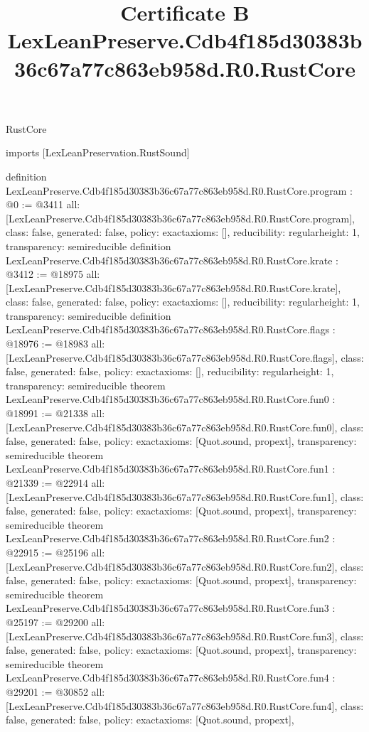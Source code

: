 \begin{lexlean}{RustCore}
\title{Certificate B LexLeanPreserve.Cdb4f185d30383b36c67a77c863eb958d.R0.RustCore}
\begin{coremodule}
imports [LexLeanPreservation.RustSound]

definition LexLeanPreserve.Cdb4f185d30383b36c67a77c863eb958d.R0.RustCore.program : @0 := @3411 {
  all: [LexLeanPreserve.Cdb4f185d30383b36c67a77c863eb958d.R0.RustCore.program],
  class: false,
  generated: false,
  policy: exact{axioms: []},
  reducibility: regular{height: 1},
  transparency: semireducible
}
definition LexLeanPreserve.Cdb4f185d30383b36c67a77c863eb958d.R0.RustCore.krate : @3412 := @18975 {
  all: [LexLeanPreserve.Cdb4f185d30383b36c67a77c863eb958d.R0.RustCore.krate],
  class: false,
  generated: false,
  policy: exact{axioms: []},
  reducibility: regular{height: 1},
  transparency: semireducible
}
definition LexLeanPreserve.Cdb4f185d30383b36c67a77c863eb958d.R0.RustCore.flags : @18976 := @18983 {
  all: [LexLeanPreserve.Cdb4f185d30383b36c67a77c863eb958d.R0.RustCore.flags],
  class: false,
  generated: false,
  policy: exact{axioms: []},
  reducibility: regular{height: 1},
  transparency: semireducible
}
theorem LexLeanPreserve.Cdb4f185d30383b36c67a77c863eb958d.R0.RustCore.fun0 : @18991 := @21338 {
  all: [LexLeanPreserve.Cdb4f185d30383b36c67a77c863eb958d.R0.RustCore.fun0],
  class: false,
  generated: false,
  policy: exact{axioms: [Quot.sound, propext]},
  transparency: semireducible
}
theorem LexLeanPreserve.Cdb4f185d30383b36c67a77c863eb958d.R0.RustCore.fun1 : @21339 := @22914 {
  all: [LexLeanPreserve.Cdb4f185d30383b36c67a77c863eb958d.R0.RustCore.fun1],
  class: false,
  generated: false,
  policy: exact{axioms: [Quot.sound, propext]},
  transparency: semireducible
}
theorem LexLeanPreserve.Cdb4f185d30383b36c67a77c863eb958d.R0.RustCore.fun2 : @22915 := @25196 {
  all: [LexLeanPreserve.Cdb4f185d30383b36c67a77c863eb958d.R0.RustCore.fun2],
  class: false,
  generated: false,
  policy: exact{axioms: [Quot.sound, propext]},
  transparency: semireducible
}
theorem LexLeanPreserve.Cdb4f185d30383b36c67a77c863eb958d.R0.RustCore.fun3 : @25197 := @29200 {
  all: [LexLeanPreserve.Cdb4f185d30383b36c67a77c863eb958d.R0.RustCore.fun3],
  class: false,
  generated: false,
  policy: exact{axioms: [Quot.sound, propext]},
  transparency: semireducible
}
theorem LexLeanPreserve.Cdb4f185d30383b36c67a77c863eb958d.R0.RustCore.fun4 : @29201 := @30852 {
  all: [LexLeanPreserve.Cdb4f185d30383b36c67a77c863eb958d.R0.RustCore.fun4],
  class: false,
  generated: false,
  policy: exact{axioms: [Quot.sound, propext]},
}
\end{coremodule}
\end{lexlean}
